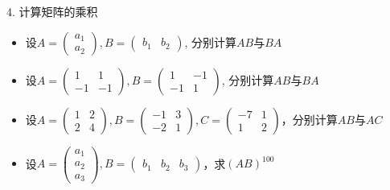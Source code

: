 \begin{frame}

4. 计算矩阵的乘积
\begin{itemize}
\item[(1)] 设$A = \begin{pmatrix} a_1 \\ a_2 \end{pmatrix}, B = \begin{pmatrix} b_1 & b_2 \end{pmatrix}$, 分别计算$AB$与$BA$
\vspace{0.5em}
\item[(2)] 设$A = \begin{pmatrix} 1 & 1 \\ -1 & -1 \end{pmatrix}, B = \begin{pmatrix} 1 & -1 \\ -1 & 1 \end{pmatrix}$, 分别计算$AB$与$BA$
\vspace{0.5em}
\item[(3)] 设$A = \begin{pmatrix} 1 & 2 \\ 2 & 4 \end{pmatrix}, B = \begin{pmatrix} -1 & 3 \\ -2 & 1 \end{pmatrix}, C = \begin{pmatrix} -7 & 1 \\ 1 & 2 \end{pmatrix}$，分别计算$AB$与$AC$
\vspace{0.5em}
\item[(4)] 设$A = \begin{pmatrix} a_1 \\ a_2 \\ a_3 \end{pmatrix}, B = \begin{pmatrix} b_1 & b_2 & b_3 \end{pmatrix}$，求$(AB)^{100}$
\end{itemize}

\end{frame}


